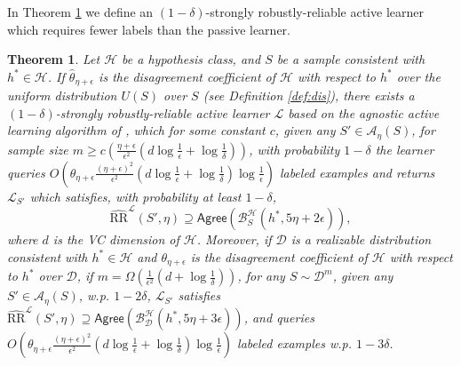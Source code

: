 \documentclass[11pt]{article}
\newcommand{\ECR}{\widehat{\text{RR}}}
\newtheorem{theorem}{Theorem}[section]
\newcommand{\0}{\mathbf{0}}
\newcommand{\1}{\mathbf{1}}
\newcommand{\cA}{\mathcal{A}}
\newcommand{\cB}{\mathcal{B}}
\newcommand{\cD}{\mathcal{D}}
\newcommand{\cH}{\mathcal{H}}
\newcommand{\cL}{\mathcal{L}}
\newcommand{\Agree}{\mathsf{Agree}}
\newcommand{\changed}[1]{#1}
\begin{document}
In Theorem \ref{thm:acl-ub} we define an $(1-\delta)$-strongly robustly-reliable active learner which requires fewer labels than the passive learner.

\begin{theorem}\label{thm:acl-ub}
Let $\cH$ be a hypothesis class, and $S$ be a sample consistent with $h^*\in\cH$. If $\hat{\theta}_{\eta+\epsilon}$ is the disagreement coefficient of $\cH$ with respect to $h^*$ over the uniform distribution $U(S)$ over $S$ (see Definition \ref{def:dis}), there exists a $(1-\delta)$-strongly robustly-reliable active learner $\cL$ based on the agnostic active learning algorithm of \cite{dasgupta2007general}, which for some constant $c$, given any $S'\in\cA_\eta(S)$, for sample size $m\geq c\left(\frac{\eta+\epsilon}{\epsilon^2}\left( d \log \frac{1}{\epsilon}+\log\frac{1}{\delta}\right) \right)$, with probability $1-\delta$ the learner queries $O\!\left( \hat{\theta}_{\eta+\epsilon} \frac{(\eta+\epsilon)^2}{\epsilon^2}\left( d \log\frac{1}{\epsilon}+\log\frac{1}{\delta} \right)\log\frac{1}{\epsilon}  \right)$ labeled examples and returns $\cL_{S'}$ which satisfies, with probability at least $1-\delta$,
\changed{$$\ECR^{\cL}(S',\eta)\supseteq\Agree(\cB_S^\cH(h^*,5\eta+2\epsilon)),$$}
where $d$ is the VC dimension of $\cH$. Moreover, if $\cD$ is a realizable distribution consistent with $h^*\in\cH$ and $\theta_{\eta+\epsilon}$ is the disagreement coefficient of $\cH$ with respect to $h^*$ over $\cD$, if $m= \Omega\left(\frac{1}{\epsilon^2}\left( d +\log\frac{1}{\delta}\right) \right)$, for any  $S\sim\cD^m$, given any $S'\in\cA_\eta(S)$, w.p.  $1-2\delta$, $\cL_{S'}$ satisfies
\changed{$\ECR^{\cL}(S',\eta)\supseteq\Agree(\cB_\cD^\cH(h^*,5\eta+3\epsilon))$,}
and queries $O\!\left( \theta_{\eta+\epsilon} \frac{(\eta+\epsilon)^2}{\epsilon^2}\left( d \log\frac{1}{\epsilon}+\log\frac{1}{\delta} \right)\log\frac{1}{\epsilon}  \right)$ labeled examples w.p. $1-3\delta$.
\end{theorem}
\end{document}
